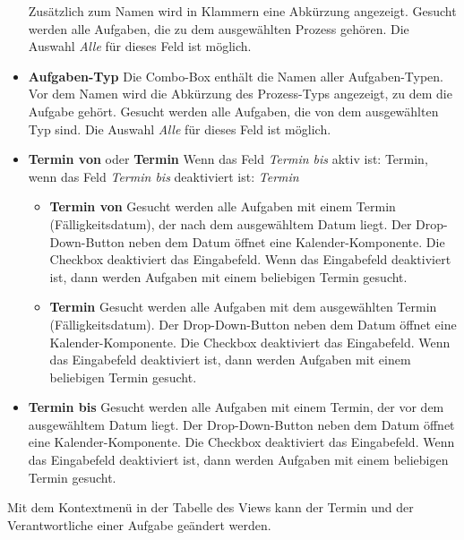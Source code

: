 \documentclass[a4paper,10pt]{book}
\begin{document}
\begin{itemize}
 Zusätzlich zum Namen wird in Klammern eine Abkürzung angezeigt. Gesucht werden
 alle Aufgaben, die zu dem ausgewählten Prozess gehören. Die Auswahl
 \textit{Alle} für dieses Feld ist möglich.
 \item \textbf{Aufgaben-Typ} Die Combo-Box enthält die Namen aller
 Aufgaben-Typen. Vor dem Namen wird die Abkürzung des Prozess-Typs angezeigt, zu
 dem die Aufgabe gehört. Gesucht werden alle Aufgaben, die von dem ausgewählten
 Typ sind. Die Auswahl \textit{Alle} für dieses Feld ist möglich.
 \item \textbf{Termin von} oder \textbf{Termin} Wenn das Feld \textit{Termin bis} aktiv ist: Termin, wenn das Feld \textit{Termin bis} deaktiviert ist: \textit{Termin}
 \begin{itemize}
 \item \textbf{Termin von} Gesucht werden alle Aufgaben mit einem Termin (Fälligkeitsdatum), der nach dem ausgewähltem Datum liegt. Der Drop-Down-Button neben dem Datum öffnet eine Kalender-Komponente. Die Checkbox deaktiviert das Eingabefeld. Wenn das Eingabefeld deaktiviert ist, dann werden Aufgaben mit einem beliebigen Termin gesucht.
 \item \textbf{Termin} Gesucht werden alle Aufgaben mit dem ausgewählten Termin (Fälligkeitsdatum). Der Drop-Down-Button neben dem Datum öffnet eine Kalender-Komponente. Die Checkbox deaktiviert das Eingabefeld. Wenn das Eingabefeld deaktiviert ist, dann werden Aufgaben mit einem beliebigen Termin gesucht.
 \end{itemize}
 \item \textbf{Termin bis} Gesucht werden alle Aufgaben mit einem Termin, der vor dem ausgewähltem Datum liegt. Der Drop-Down-Button neben dem Datum öffnet eine Kalender-Komponente. Die Checkbox deaktiviert das Eingabefeld. Wenn das Eingabefeld deaktiviert ist, dann werden Aufgaben mit einem beliebigen Termin gesucht.
\end{itemize}

Mit dem Kontextmenü in der Tabelle des Views kann der Termin und der
Verantwortliche einer Aufgabe geändert werden.
\end{document}

